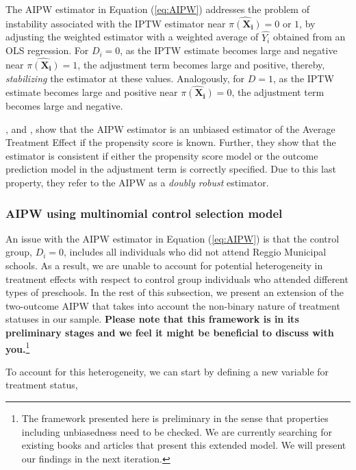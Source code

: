 The AIPW estimator in Equation (\ref{eq:AIPW}) addresses the problem of instability associated with the IPTW estimator near $\hat{\pi(\boldsymbol{X_i})} = 0$ or $1$, by adjusting the weighted estimator with a weighted average of $\hat{Y_i}$ obtained from an OLS regression. For $D_i = 0$, as the IPTW estimate becomes large and negative near $\hat{\pi(\boldsymbol{X_i})} = 1$, the adjustment term becomes large and positive, thereby, \textit{stabilizing} the estimator at these values. Analogously, for $D = 1$, as the IPTW estimate becomes large and positive near $\hat{\pi(\boldsymbol{X_i})} = 0$, the adjustment term becomes large and negative. 

\cite{Tsiatis_2006}, and \cite{Glynn_2010}, show that the AIPW estimator is an unbiased estimator of the Average Treatment Effect if the propensity score is known. Further, they show that the estimator is consistent if either the propensity score model or the outcome prediction model in the adjustment term is correctly specified. Due to this last property, they refer to the AIPW as a \textit{doubly robust} estimator.

\subsubsection{AIPW using multinomial control selection model}
An issue with the AIPW estimator in Equation (\ref{eq:AIPW}) is that the control group, $D_i=0$, includes all individuals who did not attend Reggio Municipal schools. As a result, we are unable to account for potential heterogeneity in treatment effects with respect to control group individuals who attended different types of preschools. In the rest of this subsection, we present an extension of the two-outcome AIPW that takes into account the non-binary nature of treatment statuses in our sample. \textbf{Please note that this framework is in its preliminary stages and we feel it might be beneficial to discuss with you.}\footnote{The framework presented here is preliminary in the sense that properties including unbiasedness need to be checked. We are currently searching for existing books and articles that present this extended model. We will present our findings in the next iteration.}

To account for this heterogeneity, we can start by defining a new variable for treatment status,

